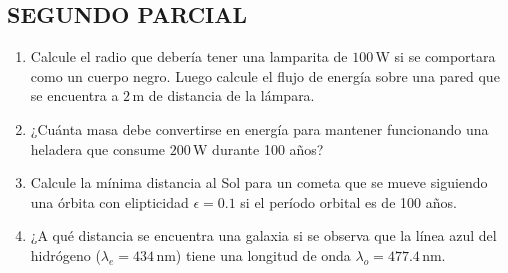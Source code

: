 \documentclass[a4paper,12pt]{article}
\begin{document}
\subsection*{SEGUNDO PARCIAL}

\begin{enumerate}

\item Calcule el radio que debería tener una lamparita de $100$\,W si se comportara como un cuerpo negro. Luego calcule el flujo de energía sobre una pared que se encuentra a $2$\,m de distancia de la lámpara.

\item ¿Cuánta masa debe convertirse en energía para mantener funcionando una
heladera que consume $200$\,W durante 100 años?

\item Calcule la mínima distancia al Sol para un cometa que se mueve siguiendo
una órbita con elipticidad $\epsilon=0.1$ si el período orbital es de 100 años.

\item ¿A qué distancia se encuentra una galaxia si se observa que la línea azul
del hidrógeno ($\lambda_e=434$\,nm) tiene una longitud de onda
$\lambda_o=477.4$\,nm.

\end{enumerate}
\end{document}
